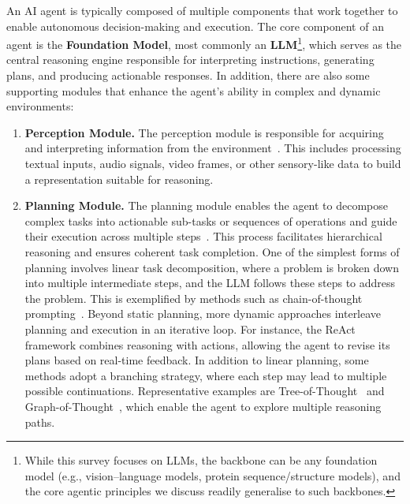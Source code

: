 \documentclass[]{selfevolagent}
\theoremstyle{plain}
\theoremstyle{definition}
\theoremstyle{remark}
\begin{document}
An AI agent is typically composed of multiple components that work together to enable autonomous decision-making and execution. The core component of an agent is the \textbf{Foundation Model}, most commonly an \textbf{LLM}\footnote{While this survey focuses on LLMs, the backbone can be any foundation model (e.g., vision–language models, protein sequence/structure models), and the core agentic principles we discuss readily generalise to such backbones.}, which serves as the central reasoning engine responsible for interpreting instructions, generating plans, and producing actionable responses. In addition, there are also some supporting modules that enhance the agent's ability in complex and dynamic environments: 

\begin{enumerate}[label=(\arabic*)]

\item \textbf{Perception Module.} The perception module is responsible for acquiring and interpreting information from the environment~\citep{li2024survey}. This includes processing textual inputs, audio signals, video frames, or other sensory-like data to build a representation suitable for reasoning. 

\item \textbf{Planning Module.} The planning module enables the agent to decompose complex tasks into actionable sub-tasks or sequences of operations and guide their execution across multiple steps~\citep{huang2024understanding}. This process facilitates hierarchical reasoning and ensures coherent task completion. One of the simplest forms of planning involves linear task decomposition, where a problem is broken down into multiple intermediate steps, and the LLM follows these steps to address the problem. This is exemplified by methods such as chain-of-thought prompting~\citep{wei2022chain}. Beyond static planning, more dynamic approaches interleave planning and execution in an iterative loop. For instance, the ReAct~\citep{yao2023react} framework combines reasoning with actions, allowing the agent to revise its plans based on real-time feedback. In addition to linear planning, some methods adopt a branching strategy, where each step may lead to multiple possible continuations. Representative examples are Tree-of-Thought~\citep{yao2023tree} and Graph-of-Thought~\citep{besta2024graph}, which enable the agent to explore multiple reasoning paths. 
    

\end{enumerate}
\end{document}
